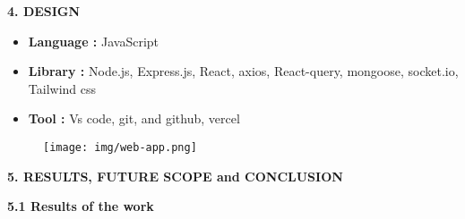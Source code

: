 \documentclass{article}
\begin{document}
\vspace{25pt}




\newpage

\begin{center}
\LARGE\bfseries 4. DESIGN \\
\end{center}



\begin{itemize}
    \item {\bfseries Language :} JavaScript
    \item  {\bfseries Library :} Node.js, Express.js, React,  axios, React-query, mongoose, socket.io, Tailwind css
    \item {\bfseries Tool :} Vs code, git, and github, vercel
\end{itemize}

\begin{figure}[h]
    \centering
    \texttt{[image: img/web-app.png]}
\end{figure}

\vspace{25pt}




\newpage

\begin{center}
    \LARGE\bfseries 5. RESULTS, FUTURE SCOPE and CONCLUSION\\
\end{center}

{\Large\bfseries 5.1 Results of the work \\}
\end{document}
